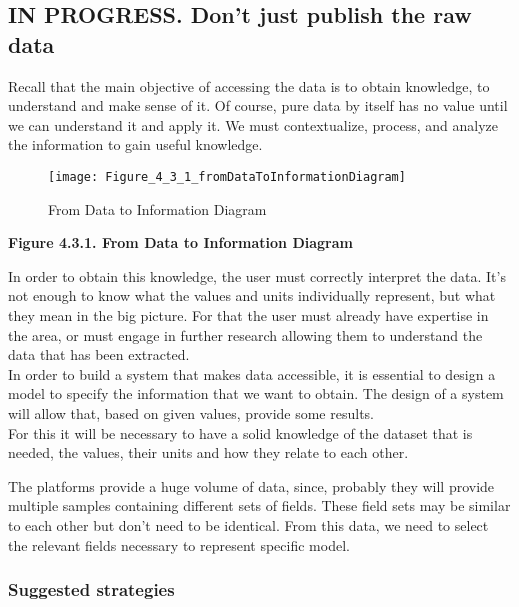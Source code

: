 \subsection{IN PROGRESS. Don't just publish the raw data}

Recall that the main objective of accessing the data is to obtain knowledge, to understand and make sense of it.
Of course, pure data by itself has no value until we can understand it and apply it.
We must contextualize, process, and analyze the information to gain useful knowledge. \\ 
    
\begin{figure}[ht]
    \centering
    \texttt{[image: Figure\_4\_3\_1\_fromDataToInformationDiagram]}
    \caption{From Data to Information Diagram}
 \end{figure}
 
\begin{center}
    \bf{        
    Figure 4.3.1. From Data to Information Diagram}
\end{center}
 
In order to obtain this knowledge, the user must correctly interpret the data.
It's not enough to know what the values and units individually represent, but what they mean in the big picture.
For that the user must already have expertise in the area, or must engage in further research allowing them to understand the data that has been extracted.\\
    
In order to build a system that makes data accessible, it is essential to design a model to specify the information that we want to obtain.
The design of a system will allow that, based on given values, provide some results.\\

For this it will be necessary to have a solid knowledge of the dataset that is needed, the values, their units and how they relate to each other.

The platforms provide a huge volume of data, since, probably they will provide multiple samples containing different sets of fields. 
These field sets may be similar to each other but don't need to be identical.
From this data, we need to select the relevant fields necessary to represent specific model.\\

\subsubsection*{Suggested strategies} 

